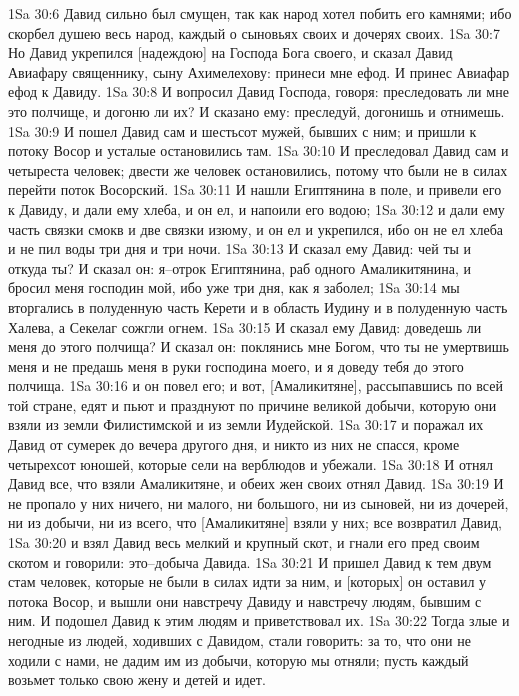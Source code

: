 1Sa 30:6  Давид сильно был смущен, так как народ хотел побить его камнями; ибо скорбел душею весь народ, каждый о сыновьях своих и дочерях своих.
1Sa 30:7  Но Давид укрепился [надеждою] на Господа Бога своего, и сказал Давид Авиафару священнику, сыну Ахимелехову: принеси мне ефод. И принес Авиафар ефод к Давиду.
1Sa 30:8  И вопросил Давид Господа, говоря: преследовать ли мне это полчище, и догоню ли их? И сказано ему: преследуй, догонишь и отнимешь.
1Sa 30:9  И пошел Давид сам и шестьсот мужей, бывших с ним; и пришли к потоку Восор и усталые остановились там.
1Sa 30:10  И преследовал Давид сам и четыреста человек; двести же человек остановились, потому что были не в силах перейти поток Восорский.
1Sa 30:11  И нашли Египтянина в поле, и привели его к Давиду, и дали ему хлеба, и он ел, и напоили его водою;
1Sa 30:12  и дали ему часть связки смокв и две связки изюму, и он ел и укрепился, ибо он не ел хлеба и не пил воды три дня и три ночи.
1Sa 30:13  И сказал ему Давид: чей ты и откуда ты? И сказал он: я--отрок Египтянина, раб одного Амаликитянина, и бросил меня господин мой, ибо уже три дня, как я заболел;
1Sa 30:14  мы вторгались в полуденную часть Керети и в область Иудину и в полуденную часть Халева, а Секелаг сожгли огнем.
1Sa 30:15  И сказал ему Давид: доведешь ли меня до этого полчища? И сказал он: поклянись мне Богом, что ты не умертвишь меня и не предашь меня в руки господина моего, и я доведу тебя до этого полчища.
1Sa 30:16  и он повел его; и вот, [Амаликитяне], рассыпавшись по всей той стране, едят и пьют и празднуют по причине великой добычи, которую они взяли из земли Филистимской и из земли Иудейской.
1Sa 30:17  и поражал их Давид от сумерек до вечера другого дня, и никто из них не спасся, кроме четырехсот юношей, которые сели на верблюдов и убежали.
1Sa 30:18  И отнял Давид все, что взяли Амаликитяне, и обеих жен своих отнял Давид.
1Sa 30:19  И не пропало у них ничего, ни малого, ни большого, ни из сыновей, ни из дочерей, ни из добычи, ни из всего, что [Амаликитяне] взяли у них; все возвратил Давид,
1Sa 30:20  и взял Давид весь мелкий и крупный скот, и гнали его пред своим скотом и говорили: это--добыча Давида.
1Sa 30:21  И пришел Давид к тем двум стам человек, которые не были в силах идти за ним, и [которых] он оставил у потока Восор, и вышли они навстречу Давиду и навстречу людям, бывшим с ним. И подошел Давид к этим людям и приветствовал их.
1Sa 30:22  Тогда злые и негодные из людей, ходивших с Давидом, стали говорить: за то, что они не ходили с нами, не дадим им из добычи, которую мы отняли; пусть каждый возьмет только свою жену и детей и идет.
